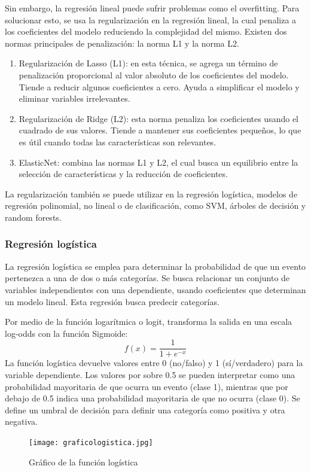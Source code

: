 \documentclass[a4paper, 12pt]{book}
\begin{document}
Sin embargo, la regresión lineal puede sufrir problemas como el overfitting. Para solucionar esto, se usa la regularización en la regresión lineal, la cual penaliza a los coeficientes del modelo reduciendo la complejidad del mismo. Existen dos normas principales de penalización: la norma L1 y la norma L2.
\begin{enumerate}
	\item Regularización de Lasso (L1): en esta técnica, se agrega un término de penalización proporcional al valor absoluto de los coeficientes del modelo. Tiende a reducir algunos coeficientes a cero. Ayuda a simplificar el modelo y eliminar variables irrelevantes.
	\item Regularización de Ridge (L2): esta norma penaliza los coeficientes usando el cuadrado de sus valores. Tiende a mantener sus coeficientes pequeños, lo que es útil cuando todas las características son relevantes.
	\item ElasticNet: combina las normas L1 y L2, el cual busca un equilibrio entre la selección de características y la reducción de coeficientes.
\end{enumerate}
La regularización también se puede utilizar en la regresión logística, modelos de regresión polinomial, no lineal o de clasificación, como SVM, árboles de decisión y random forests.
\subsubsection{Regresión logística}
La regresión logística se emplea para determinar la probabilidad de que un evento pertenezca a una de dos o más categorías. Se busca relacionar un conjunto de variables independientes con una dependiente, usando coeficientes que determinan un modelo lineal. Esta regresión busca predecir categorías.

Por medio de la función logarítmica o logit, transforma la salida en una escala log-odds con la función Sigmoide:
\begin{equation}
	f(x) = \frac{1}{1+e^{-x}}
\end{equation}
La función logística devuelve valores entre 0 (no/falso) y 1 (sí/verdadero) para la variable dependiente. Los valores por sobre 0.5 se pueden interpretar como una probabilidad mayoritaria de que ocurra un evento (clase 1), mientras que por debajo de 0.5 indica una probabilidad mayoritaria de que no ocurra (clase 0). Se define un umbral de decisión para definir una categoría como positiva y otra negativa.

\begin{figure}[H] 
	\centering 
	\texttt{[image: graficologistica.jpg]}
	\caption{Gráfico de la función logística}
\end{figure}
\end{document}
